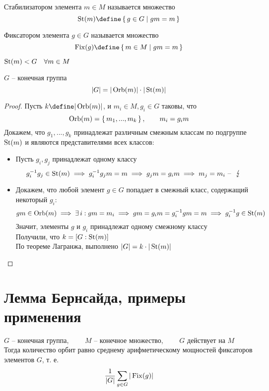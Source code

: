 \begin{definition}
	Стабилизатором элемента $ m \in M $ называется множество
	$$ \St(m) \define \set{g \in G | gm = m} $$
\end{definition}

\begin{definition}
	Фиксатором элемента $ g \in G $ называется множество
	$$ \Fix(g) \define \set{m \in M | gm = m} $$
\end{definition}

\begin{props}
	\item $ \operatorname{St}(m) < G \quad \forall m \in M $
	\item $ G $ -- конечная группа
	$$ |G| = |\operatorname{Orb}(m)| \cdot |\operatorname{St}(m)| $$
\end{props}

\begin{proof}
	Пусть $ k \define |\Orb(m)| $, и $ m_i \in M, g_i \in G $ таковы, что
	$$ \operatorname{Orb}(m) = \set{m_1, ..., m_k}, \qquad m_i = g_im $$
	Докажем, что $ g_1, ..., g_k $ принадлежат различным смежным классам по подгруппе $ \operatorname{St}(m) $ и являются представителями всех классов:
	\begin{itemize}
		\item Пусть $ g_i, g_j $ принадлежат одному классу
		$$ g_i^{-1}g_j \in \St(m) \implies g_i^{-1}g_jm = m \implies g_jm = g_im \implies m_j = m_i \text{ -- \contra} $$
		\item Докажем, что любой элемент $ g \in G $ попадает в смежный класс, содержащий некоторый $ g_i $:
		$$ gm \in \operatorname{Orb}(m) \implies \exists\, i : gm = m_i \implies gm = g_im = g_i^{-1}gm = m \implies g_i^{-1}g \in \operatorname{St}(m) $$
		Значит, элементы $ g $ и $ g_i $ принадлежат одному смежному классу \\
		Получили, что $ k = [G : \operatorname{St}(m)] $ \\
		По теореме Лагранжа, выполнено $ |G| = k \cdot |\operatorname{St}(m)| $
	\end{itemize}
\end{proof}

\section{Лемма Бернсайда, примеры применения}

\begin{lemma}[Бернсайда]
	$ G $ -- конечная группа, $ \qquad M $ -- конечное множество, $ \qquad G $ действует на $ M $ \\
	Тогда количество орбит равно среднему арифметическому мощностей фиксаторов элементов $ G $, т. е.
	$$ \frac1{|G|} \sum_{g \in G} |\operatorname{Fix}(g)| $$
\end{lemma}

